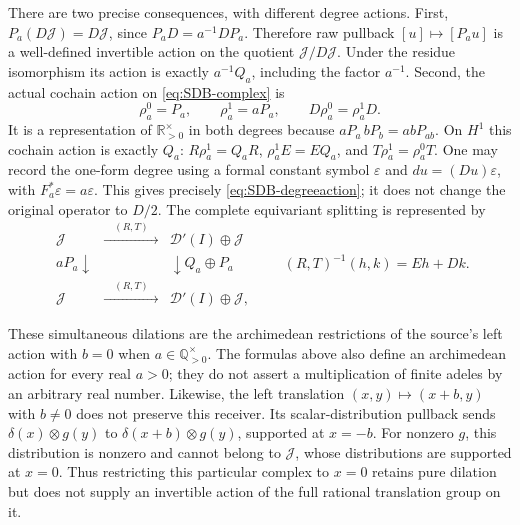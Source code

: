 There are two precise consequences, with different degree actions.
First, $P_a(D\mathcal J)=D\mathcal J$, since
$P_aD=a^{-1}DP_a$. Therefore raw pullback $[u]\mapsto[P_a u]$
is a well-defined invertible action on the quotient
$\mathcal J/D\mathcal J$. Under the residue isomorphism its action
is exactly $a^{-1}Q_a$, including the factor $a^{-1}$.
Second, the actual cochain action on \eqref{eq:SDB-complex} is
\begin{equation}\tag{SDB22}\label{eq:SDB-degreeaction}
 \rho_a^0=P_a,\qquad \rho_a^1=aP_a,
 \qquad D\rho_a^0=\rho_a^1D.
\end{equation}
It is a representation of $\mathbb R_{>0}^{\times}$ in both degrees
because $aP_a\,bP_b=abP_{ab}$. On $H^1$ this cochain action is
exactly $Q_a$:
$R\rho_a^1=Q_aR$, $\rho_a^1E=EQ_a$, and
$T\rho_a^1=\rho_a^0T$.
One may record the one-form degree using a formal constant symbol
$\varepsilon$ and $d u=(Du)\varepsilon$, with
$F_a^*\varepsilon=a\varepsilon$. This gives precisely
\eqref{eq:SDB-degreeaction}; it does not change the original operator
to $D/2$.
The complete equivariant splitting is represented by
\begin{equation}\tag{SDB23}\label{eq:SDB-equivdiagram}
 \begin{array}{ccc}
 \mathcal J&\xrightarrow{\quad(R,T)\quad}&
                   \mathcal D'(I)\oplus\mathcal J\\
 {\scriptstyle aP_a}\downarrow&&
          \downarrow{\scriptstyle Q_a\oplus P_a}\\
 \mathcal J&\xrightarrow{\quad(R,T)\quad}&
                   \mathcal D'(I)\oplus\mathcal J,
 \end{array}
 \qquad (R,T)^{-1}(h,k)=Eh+Dk.
\end{equation}

These simultaneous dilations are the archimedean restrictions of the
source's left action with $b=0$ when $a\in\mathbb Q_{>0}^{\times}$.
The formulas above also define an archimedean action for every real
$a>0$; they do not assert a multiplication of finite adeles by an
arbitrary real number. Likewise, the left translation
$(x,y)\mapsto(x+b,y)$ with $b\ne0$ does not preserve this receiver.
Its scalar-distribution pullback sends $\delta(x)\otimes g(y)$
to $\delta(x+b)\otimes g(y)$, supported at $x=-b$. For nonzero
$g$, this distribution is nonzero and cannot belong to $\mathcal J$,
whose distributions are supported at $x=0$. Thus restricting this
particular complex to $x=0$ retains pure dilation but does not supply
an invertible action of the full rational translation group on it.

